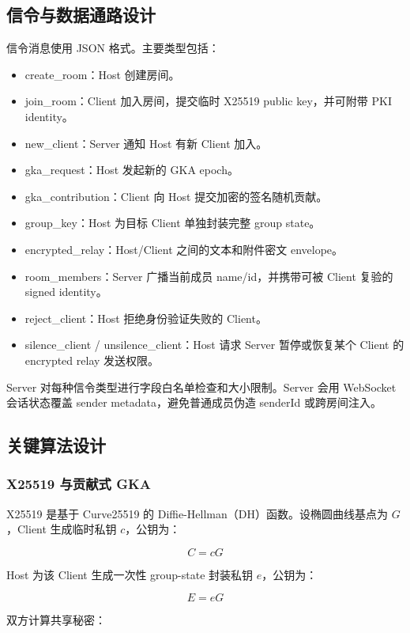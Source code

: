 \documentclass[UTF8,a4paper,12pt]{ctexart}
\begin{document}
\subsection{信令与数据通路设计}

信令消息使用 JSON 格式。主要类型包括：

\begin{itemize}
  \item create\_room：Host 创建房间。
  \item join\_room：Client 加入房间，提交临时 X25519 public key，并可附带 PKI identity。
  \item new\_client：Server 通知 Host 有新 Client 加入。
  \item gka\_request：Host 发起新的 GKA epoch。
  \item gka\_contribution：Client 向 Host 提交加密的签名随机贡献。
  \item group\_key：Host 为目标 Client 单独封装完整 group state。
  \item encrypted\_relay：Host/Client 之间的文本和附件密文 envelope。
  \item room\_members：Server 广播当前成员 name/id，并携带可被 Client 复验的 signed identity。
  \item reject\_client：Host 拒绝身份验证失败的 Client。
  \item silence\_client / unsilence\_client：Host 请求 Server 暂停或恢复某个 Client 的 encrypted relay 发送权限。
\end{itemize}

Server 对每种信令类型进行字段白名单检查和大小限制。Server 会用 WebSocket 会话状态覆盖 sender metadata，避免普通成员伪造 senderId 或跨房间注入。

\subsection{关键算法设计}

\subsubsection{X25519 与贡献式 GKA}

X25519 是基于 Curve25519 的 Diffie-Hellman（DH）函数。设椭圆曲线基点为 \(G\)，Client 生成临时私钥 \(c\)，公钥为：

\[
C = cG
\]

Host 为该 Client 生成一次性 group-state 封装私钥 \(e\)，公钥为：

\[
E = eG
\]

双方计算共享秘密：
\end{document}
